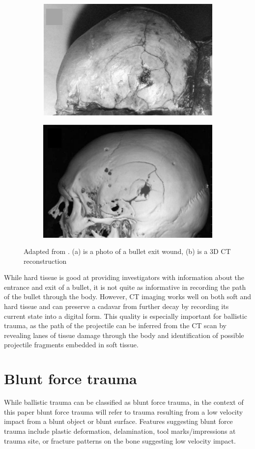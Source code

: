 \documentclass[titlepage]{article}
\begin{document}
\begin{figure}[h!]
\centering
\begin{subfigure}{.5\textwidth}
  \centering
  \includegraphics[width=.7\linewidth]{exit}
  \end{subfigure}%
\begin{subfigure}{.5\textwidth}
  \centering
  \includegraphics[width=.7\linewidth]{exit_ct}
\end{subfigure}
\caption{Adapted from \cite{post-imaging}. (a) is a photo of a bullet exit wound, (b) is a 3D CT reconstruction}
\label{fig:exit_wound}
\end{figure}

While hard tissue is good at providing investigators with information about the entrance and exit of a bullet, it is not quite as informative in recording the path of the bullet through the body. However, CT imaging works well on both soft and hard tissue and can preserve a cadavar from further decay by recording its current state into a digital form. This quality is especially important for ballistic trauma, as the path of the projectile can be inferred from the CT scan by revealing lanes of tissue damage through the body and identification of possible projectile fragments embedded in soft tissue.

\section{Blunt force trauma}
While ballistic trauma can be classified as blunt force trauma, in the context of this paper blunt force trauma will refer to trauma resulting from a low velocity impact from a blunt object or blunt surface. Features suggesting blunt force trauma include plastic deformation, delamination, tool marks/impressions at trauma site, or fracture patterns on the bone suggesting low velocity impact.\cite{trauma}
\end{document}
